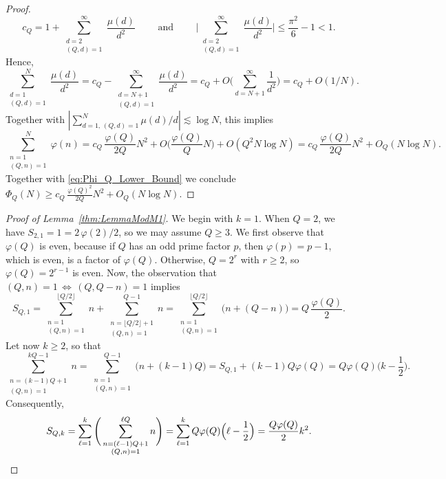 \documentclass[11pt,reqno]{amsart}
\theoremstyle{definition}
\begin{document}
\begin{proof}
\begin{equation}
c_Q = 1 + \sum_{\substack{ d=2 \\  (Q,d) = 1  } }^\infty  \frac{\mu(d)}{d^2} 
\qquad \text{ and } \qquad 
\Bigg| \sum_{\substack{ d=2 \\  (Q,d) = 1  } }^\infty  \frac{\mu(d)}{d^2}  \Bigg| \leq \frac{\pi^2}{6} - 1 < 1.
\end{equation}
Hence, 
\begin{equation}
\sum_{\substack{ d=1 \\  (Q,d) = 1  } }^N  \frac{\mu(d)}{d^2} = c_Q - \sum_{\substack{ d=N+1 \\  (Q,d) = 1  } }^\infty  \frac{\mu(d)}{d^2}
= c_Q + O\Big( \sum_{ d=N+1 }^\infty  \frac{1}{d^2}  \Big) = c_Q + O(1/N). 
\end{equation}
Together with $|\sum_{d=1, \, (Q,d)=1}^N \mu(d)/d| \lesssim \log N$, 
this implies
\begin{equation}
\sum_{\substack{ n=1 \\  (Q,n) = 1  } }^N \varphi(n) 
= c_Q\, \frac{\varphi(Q)}{2Q} N^2 + O\Big( \frac{\varphi(Q)}{Q} N \Big) + O (Q^2 N \log N)
 =  c_Q\, \frac{\varphi(Q)}{2Q} N^2 + O_Q(N \log N).
\end{equation}
Together with \eqref{eq:Phi_Q_Lower_Bound} we conclude $\Phi_Q(N) \geq c_Q\, \frac{\varphi(Q)^2}{2Q} N^2 + O_Q(N \log N)$. 
\end{proof}

\begin{proof}[Proof of Lemma~\ref{thm:LemmaModM1}]
We begin with $k=1$. 
When $Q=2$, we have $S_{2,1} = 1 = 2\, \varphi(2)/2$, 
so we may assume $Q \geq 3$. 
We first observe that $\varphi(Q)$ is even, 
because if $Q$ has an odd prime factor $p$, 
then $\varphi(p) = p-1$, which is even, 
is a factor of $\varphi(Q)$. 
Otherwise, $Q = 2^r$ with $r \geq 2$, 
so $\varphi(Q) = 2^{r-1}$ is even.
Now, the observation that 
$(Q,n) = 1 \, \Longleftrightarrow \, (Q,Q-n)=1$
implies
\begin{equation}
S_{Q,1}
= \sum_{\substack{ n = 1 \\ (Q,n) = 1 }}^{\lfloor Q/2 \rfloor} n +  \sum_{\substack{ n = \lfloor Q/2 \rfloor + 1 \\ (Q,n) = 1 }}^{Q - 1} n 
= \sum_{\substack{ n = 1 \\ (Q,n) = 1 }}^{\lfloor Q/2 \rfloor} \big(n + (Q - n) \big)
= Q \,  \frac{\varphi(Q)}{2}.
\end{equation}
Let now $k \geq 2$, so that
\begin{equation}
 \sum_{\substack{ n = (k-1)Q + 1 \\ (Q,n) = 1 }}^{kQ-1} n
= \sum_{\substack{ n =  1 \\ (Q,n) = 1 }}^{Q-1} \bigg( n + (k-1)Q \bigg)
= S_{Q,1} + (k-1)Q\varphi(Q)
= Q \varphi(Q) \Big( k - \frac12 \Big).
\end{equation}
Consequently, 
\[
S_{Q, k} 
= \sum_{\ell=1}^k \Bigg(  \sum_{\substack{ n = (\ell - 1) Q + 1 \\ (Q,n) = 1 }}^{\ell Q} n \Bigg)
= \sum_{\ell=1}^k  Q \varphi(Q) \Big( \ell -  \frac12 \Big)
= \frac{Q\varphi(Q)}{2} k^2.
\qedhere
\]
\end{proof}
\end{document}
